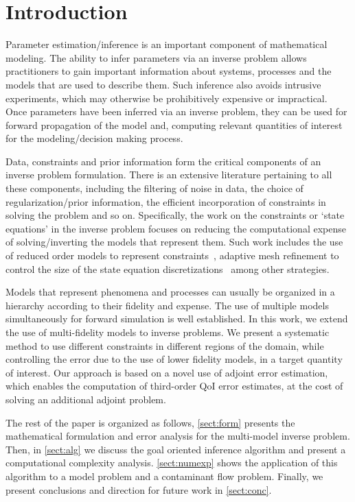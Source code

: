 \section{Introduction}

Parameter estimation/inference is an important component of mathematical modeling. The ability to infer parameters via an inverse problem allows practitioners to gain important information about systems, processes and the models that are used to describe them. Such inference also avoids intrusive experiments, which may otherwise be prohibitively expensive or impractical. Once parameters have been inferred via an inverse problem, they can be used for forward propagation of the model and, computing relevant quantities of interest for the modeling/decision making process.

Data, constraints and prior information form the critical components of an inverse problem formulation. There is an extensive literature pertaining to all these components, including the filtering of noise in data, the choice of regularization/prior information, the efficient incorporation of constraints in solving the problem and so on. Specifically, the work on the constraints or `state equations' in the inverse problem focuses on reducing the computational expense of solving/inverting the models that represent them. Such work includes the use of reduced order models to represent constraints~\cite{}, adaptive mesh refinement to control the size of the state equation discretizations~\cite{} among other strategies.

Models that represent phenomena and processes can usually be organized in a hierarchy according to their fidelity and expense. The use of multiple models simultaneously for forward simulation is well established. In this work, we extend the use of multi-fidelity models to inverse problems. We present a systematic method to use different constraints in different regions of the domain, while controlling the error due to the use of lower fidelity models, in a target quantity of interest. Our approach is based on a novel use of adjoint error estimation, which enables the computation of third-order QoI error estimates, at the cost of solving an additional adjoint problem.

The rest of the paper is organized as follows, \cref{sect:form} presents the mathematical formulation and error analysis for the multi-model inverse problem. Then, in \cref{sect:alg} we discuss the goal oriented inference algorithm and present a computational complexity analysis. \cref{sect:numexp} shows the application of this algorithm to a model problem and a contaminant flow problem. Finally, we present conclusions and direction for future work in \cref{sect:conc}.

